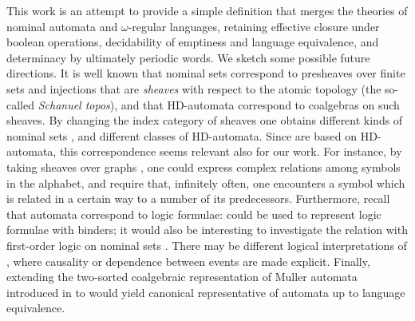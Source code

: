 This work is an attempt to provide a simple definition that merges the theories of nominal automata and $\omega$-regular languages, retaining effective closure under boolean operations, decidability of emptiness and language equivalence, and determinacy by ultimately periodic words. We sketch some possible future directions. It is well known that nominal sets correspond to presheaves over finite sets and injections that are \emph{sheaves} with respect to the atomic topology (the so-called \emph{Schanuel topos}), and that HD-automata correspond to coalgebras on such sheaves. By changing the index category of sheaves one obtains different kinds of nominal sets \cite{CianciaKM10}, and different classes of HD-automata. Since \hdmas{} are based on HD-automata, this correspondence seems relevant also for our work. For instance, by taking sheaves over graphs \cite{SammartinoPhD}, one could express complex relations among symbols in the alphabet, and require that, infinitely often, one encounters a symbol which is related in a certain way to a number of its predecessors. Furthermore, recall that automata correspond to logic formulae: \hdmas{} could be used to represent logic formulae with binders; it would also be interesting to investigate the relation with first-order logic on nominal sets \cite{Bojanczyk13}. There may be different logical interpretations of \hdmas, where causality or dependence \cite{Vnnen07,Galliani12} between events are made explicit. Finally, extending the two-sorted coalgebraic representation of Muller automata introduced in \cite{CV12} to \hdmas{} would yield canonical representative of automata up to language equivalence.







